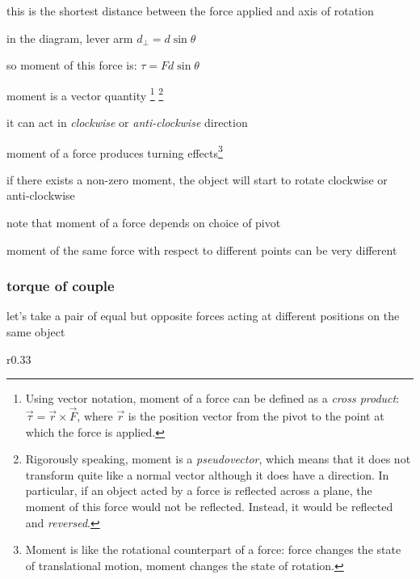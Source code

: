 this is the shortest distance between the force applied and axis of rotation

in the diagram, lever arm $d_\perp = d\sin\theta$

so moment of this force is: $\tau = Fd\sin\theta$

\cmt moment is a vector quantity
\footnote{Using vector notation, moment of a force can be defined as a \emph{cross product}: $\overrightarrow{\tau} = \overrightarrow{r}\times\overrightarrow{F}$, where $\overrightarrow{r}$ is the position vector from the pivot to the point at which the force is applied.}
\footnote{Rigorously speaking, moment is a \emph{pseudovector}, which means that it does not transform quite like a normal vector although it does have a direction. In particular, if an object acted by a force is reflected across a plane, the moment of this force would not be reflected. Instead, it would be reflected and \emph{reversed}.}

it can act in \emph{clockwise} or \emph{anti-clockwise} direction

\cmt moment of a force produces turning effects\footnote{Moment is like the rotational counterpart of a force: force changes the state of translational motion, moment changes the state of rotation.}

if there exists a non-zero moment, the object will start to rotate clockwise or anti-clockwise

\cmt note that moment of a force depends on choice of pivot

moment of the same force with respect to different points can be very different



\subsubsection{torque of couple}\label{ch:torque-of-couple}

let's take a pair of equal but opposite forces acting at different positions on the same object

\begin{wrapfigure}{r}{0.33\textwidth}
	\centering
	\vspace*{-8pt}
	\vspace*{-16pt}
\end{wrapfigure}

